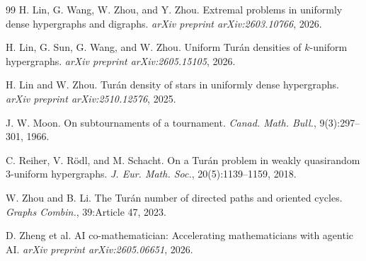 \documentclass[a4paper]{amsart}
\begin{document}
\begin{thebibliography}{99}
H. Lin, G. Wang, W. Zhou, and Y. Zhou.
\newblock Extremal problems in uniformly dense hypergraphs and digraphs.
\newblock \emph{arXiv preprint arXiv:2603.10766}, 2026.

H. Lin, G. Sun, G. Wang, and W. Zhou.
\newblock Uniform Tur\'an densities of $k$-uniform hypergraphs.
\newblock \emph{arXiv preprint arXiv:2605.15105}, 2026.

H. Lin and W. Zhou.
\newblock Tur\'an density of stars in uniformly dense hypergraphs.
\newblock \emph{arXiv preprint arXiv:2510.12576}, 2025.

J. W. Moon.
\newblock On subtournaments of a tournament.
\newblock \emph{Canad. Math. Bull.}, 9(3):297--301, 1966.

C. Reiher, V. R\"odl, and M. Schacht.
\newblock On a Tur\'an problem in weakly quasirandom 3-uniform hypergraphs.
\newblock \emph{J. Eur. Math. Soc.}, 20(5):1139--1159, 2018.

W. Zhou and B. Li.
\newblock The Tur\'an number of directed paths and oriented cycles.
\newblock \emph{Graphs Combin.}, 39:Article 47, 2023.

D. Zheng et al.
\newblock AI co-mathematician: Accelerating mathematicians with agentic AI.
\newblock \emph{arXiv preprint arXiv:2605.06651}, 2026.

\end{thebibliography}
\end{document}
